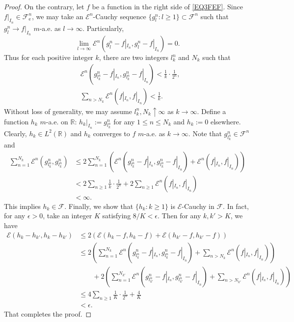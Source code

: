 \documentclass[a4paper]{amsart}
\theoremstyle{definition}
\theoremstyle{remark}
\numberwithin{equation}{section}
\begin{document}
\begin{proof}
 On the contrary, let $f$ be a function in the right side of \eqref{EQ3FEF}. Since $f|_{I_n}\in {{\mathcal{F}}}^n_\mathrm{e}$, we may take an ${{\mathcal{E}}}^n$-Cauchy sequence $\{g^n_l: l\geq 1\}\subset {{\mathcal{F}}}^n$ such that $g^n_l\rightarrow f|_{I_n}$ $m$-a.e. as $l\rightarrow \infty$. Particularly,
\[
	\lim_{l\rightarrow \infty}{{\mathcal{E}}}^n(g^n_l-f|_{I_n}, g^n_l-f|_{I_n})=0.
\]
Thus for each positive integer $k$, there are two integers $l_k^n$ and $N_k$ such that
\[
\begin{aligned}
	&{{\mathcal{E}}}^n(g^n_{l^n_k}-f|_{I_n}, g^n_{l^n_k}-f|_{I_n})<\frac{1}{k}\cdot \frac{1}{2^n}, \\
	&\sum_{n>N_k}{{\mathcal{E}}}^n(f|_{I_n},f|_{I_n})<\frac{1}{k}.
\end{aligned}\]
Without loss of generality, we may assume $l^n_k, N_k\uparrow \infty$ as $k\rightarrow \infty$.
Define a function $h_k$ $m$-a.e. on $\mathbb{R}$: $h_k|_{I_n}:= g^n_{l^n_k}$ for any $1\leq n\leq N_k$ and $h_k:=0$ elsewhere. Clearly, $h_k\in L^2(\mathbb{R})$ and $h_k$ converges to $f$ $m$-a.e. as $k\rightarrow \infty$. Note that $g^n_{l^n_k}\in {{\mathcal{F}}}^n$ and
\[
\begin{aligned}
	\sum_{n= 1}^{N_k}{{\mathcal{E}}}^n(g^n_{l^n_k}, g^n_{l^n_k})& \leq 2\sum_{n= 1}^{N_k} \left({{\mathcal{E}}}^n(g^n_{l^n_k}-f|_{I_n}, g^n_{l^n_k}-f|_{I_n})+{{\mathcal{E}}}^n(f|_{I_n},f|_{I_n}) \right)  \\
	&< 2\sum_{n\geq 1} \frac{1}{k}\cdot \frac{1}{2^n} + 2\sum_{n\geq 1}{{\mathcal{E}}}^n(f|_{I_n},f|_{I_n})  \\	
	&<\infty.
\end{aligned}
\]
This implies $h_k\in {{\mathcal{F}}}$.  Finally, we show that $\{h_k: k\geq 1\}$ is ${{\mathcal{E}}}$-Cauchy in ${{\mathcal{F}}}$. In fact, for any $\epsilon>0$, take an integer $K$ satisfying $8/K<\epsilon$. Then for any $k, k'>K$, we have
\[
\begin{aligned}
{{\mathcal{E}}}(h_k-h_{k'},h_k-h_{k'})&\leq 2\left({{\mathcal{E}}}(h_k-f,h_k-f)+{{\mathcal{E}}}(h_{k'}-f,h_{k'}-f) \right) \\
&\leq 2\left(\sum_{n=1}^{N_k}{{\mathcal{E}}}^n(g^n_{l^n_k}-f|_{I_n},g^n_{l^n_k}-f|_{I_n}) +\sum_{n>N_k}{{\mathcal{E}}}^n(f|_{I_n},f|_{I_n}) \right) \\
&\qquad +2\left(\sum_{n=1}^{N_{k'}}{{\mathcal{E}}}^n(g^n_{l^n_{k'}}-f|_{I_n},g^n_{l^n_{k'}}-f|_{I_n}) +\sum_{n>N_{k'}}{{\mathcal{E}}}^n(f|_{I_n},f|_{I_n}) \right) \\
&\leq 4\sum_{n\geq 1}\frac{1}{K}\cdot \frac{1}{2^n}+\frac{4}{K}\\
&<\epsilon.
\end{aligned}\]
That completes the proof.
\end{proof}
\end{document}
